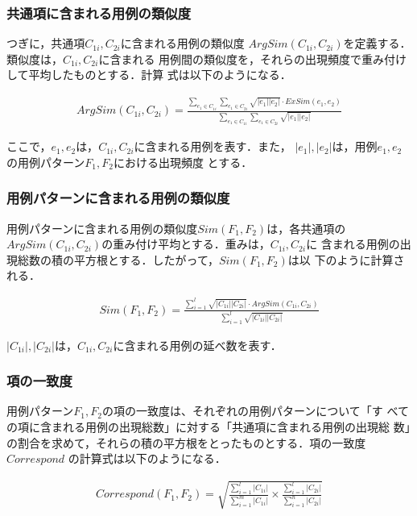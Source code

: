 \subsubsection{共通項に含まれる用例の類似度}

つぎに，共通項$C_{1i}, C_{2i}$に含まれる用例の類似度
$ArgSim(C_{1i},C_{2i})$を定義する．類似度は，$C_{1i}, C_{2i}$に含まれる
用例間の類似度を，それらの出現頻度で重み付けして平均したものとする．計算
式は以下のようになる．

\begin{eqnarray*}
 ArgSim(C_{1i}, C_{2i}) = 
  \frac{
  \sum_{ e_1 \in C_{1i} } \sum_{ e_1 \in C_{2i} } \sqrt{|e_1||e_2|} \cdot ExSim(e_1,e_2)
  }
  {
  \sum_{ e_1 \in C_{1i} } \sum_{ e_1 \in C_{2i} } \sqrt{|e_1||e_2|}
  }
\end{eqnarray*}

ここで，$e_1,e_2$は，$C_{1i}, C_{2i}$に含まれる用例を表す．また，
$|e_1|,|e_2|$は，用例$ e_1,e_2 $の用例パターン$F_1,F_2$における出現頻度
とする．


\subsubsection{用例パターンに含まれる用例の類似度}

用例パターンに含まれる用例の類似度$Sim(F_1,F_2)$は，各共通項の
$ArgSim(C_{1i},C_{2i})$の重み付け平均とする．重みは，$C_{1i},C_{2i}$に
含まれる用例の出現総数の積の平方根とする．したがって，$Sim(F_1,F_2)$は以
下のように計算される．

\begin{eqnarray*}
 Sim( F_1, F_2 ) =
  \frac{
  \sum_{i=1}^{l} \sqrt{|C_{1i}||C_{2i}|} \cdot ArgSim(C_{1i},C_{2i})
  }
  {
  \sum_{i=1}^{l} \sqrt{|C_{1i}||C_{2i}|}
  }
\end{eqnarray*}

$|C_{1i}|,|C_{2i}|$は，$C_{1i},C_{2i}$に含まれる用例の延べ数を表す．


\subsubsection{項の一致度}

用例パターン$F_1, F_2$の項の一致度は、それぞれの用例パターンについて「す
べての項に含まれる用例の出現総数」に対する「共通項に含まれる用例の出現総
数」の割合を求めて，それらの積の平方根をとったものとする．項の一致度
$Correspond$ の計算式は以下のようになる．

\begin{eqnarray*}
 Correspond( F_1, F_2 ) =
  \sqrt{
  \frac{\sum_{i = 1}^{l}|C_{1i}|}{\sum_{i=1}^{m}|C_{1i}|} \times
  \frac{\sum_{i = 1}^{l}|C_{2i}|}{\sum_{i=1}^{n}|C_{2i}|}
  }
\end{eqnarray*}


